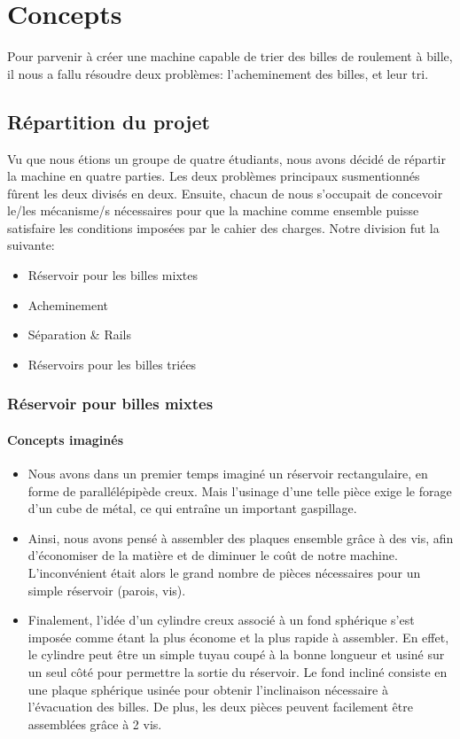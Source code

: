 \chapter{Concepts}
Pour parvenir à créer une machine capable de trier des billes de roulement à bille, il nous a fallu résoudre deux problèmes: l'acheminement des billes, et leur tri.

\section{Répartition du projet}
Vu que nous étions un groupe de quatre étudiants, nous avons décidé de répartir la machine en quatre parties. Les deux problèmes principaux susmentionnés fûrent les deux divisés en deux. Ensuite, chacun de nous s'occupait de concevoir le/les mécanisme/s nécessaires pour que la machine comme ensemble puisse satisfaire les conditions imposées par le cahier des charges. Notre division fut la suivante:
\begin{itemize}
    \item Réservoir pour les billes mixtes
    \item Acheminement
    \item Séparation \& Rails
    \item Réservoirs pour les billes triées
\end{itemize}

\subsection{Réservoir pour billes mixtes}
\subsubsection{Concepts imaginés}
\begin{itemize}
    \item Nous avons dans un premier temps imaginé un réservoir rectangulaire, en forme de parallélépipède creux. Mais l’usinage d’une telle pièce exige le forage d’un cube de métal, ce qui entraîne un important gaspillage. 
    \item Ainsi, nous avons pensé à assembler des plaques ensemble grâce à des vis, afin d’économiser de la matière et de diminuer le coût de notre machine. L'inconvénient était alors le grand nombre de pièces nécessaires pour un simple réservoir (parois, vis). 
    \item Finalement, l’idée d’un cylindre creux associé à un fond sphérique s’est imposée comme étant la plus économe et la plus rapide à assembler. En effet, le cylindre peut être un simple tuyau coupé à la bonne longueur et usiné sur un seul côté pour permettre la sortie du réservoir. Le fond incliné consiste en une plaque sphérique usinée pour obtenir l'inclinaison nécessaire à l'évacuation des billes. De plus, les deux pièces peuvent facilement être assemblées grâce à 2 vis.
\end{itemize}

